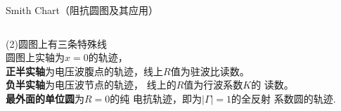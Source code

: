 \begin{frame}{Smith Chart（阻抗圆图及其应用）}
  \begin{columns}
    \begin{column}{0.45\linewidth}
      (2)圆图上有三条特殊线\\
      圆图上实轴为$x=0$的轨迹，\\ \textbf{正半实轴}为电压波腹点的轨迹，线上$R$值为驻波比读数。\\
      \textbf{负半实轴}为电压波节点的轨迹，
      线上的$R$值为行波系数$K$的
      读数。\\
      \textbf{最外面的单位圆}为$R=0$的纯
      电抗轨迹，即为$\lvert\Gamma\rvert=1$的全反射
      系数圆的轨迹.
    \end{column}
    \begin{column}{0.55\linewidth}
    \end{column}
  \end{columns}
\end{frame}

